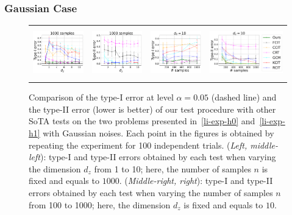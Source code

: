 \subsubsection{Gaussian Case}
\vspace{-0.4cm}




\begin{figure}[htb]
\begin{tabular}{cccc} 
\includegraphics[height=2.2cm]{sections/appendix/independence_testing_kernel/new_figures/nsamples_fixed_1000_li_dim_1_10_typeI.pdf}& \includegraphics[height=2.2cm]{sections/appendix/independence_testing_kernel/new_figures/nsamples_fixed_1000_li_dim_1_10_typeII.pdf} & 
\includegraphics[height=2.2cm]{sections/appendix/independence_testing_kernel/new_figures/dim_fixed_10_li_typeI.pdf}& \includegraphics[height=2.2cm]{sections/appendix/independence_testing_kernel/new_figures/dim_fixed_10_li_typeII.pdf} 
\end{tabular}
\caption{Comparison of the type-I error at level $\alpha=0.05$ (dashed line) and the type-II error (lower is better) of our test procedure with other SoTA tests on the two problems presented in~\eqref{li-exp-h0} and~\eqref{li-exp-h1}  with Gaussian noises. Each point in the figures is obtained by repeating the experiment for 100 independent trials. (\emph{Left, middle-left}): type-I and type-II errors obtained by each test when varying the dimension $d_z$ from 1 to 10; here, the number of samples $n$ is fixed and equals to $1000$. (\emph{Middle-right, right}): type-I and type-II errors obtained by each test when varying the number of samples $n$ from 100 to 1000; here, the dimension $d_z$ is fixed and equals to $10$. 
}
\end{figure}
